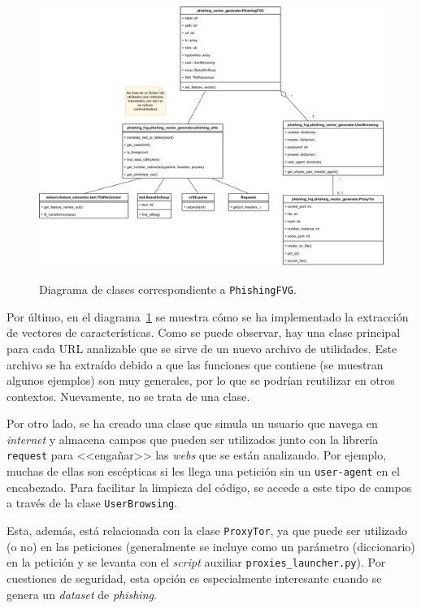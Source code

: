 \begin{figure}[h]
	\caption[Diagrama: clases (\texttt{PhishingFVG})]{Diagrama de clases correspondiente a \texttt{PhishingFVG}.}
	\centering
	\includegraphics[width=\textwidth]{../img/anexos/diagrams/classes-fvg}
	\label{c:classes-fvg}
\end{figure}

Por último, en el diagrama~\ref{c:classes-fvg} se muestra cómo se ha implementado la extracción de vectores de características. Como se puede observar, hay una clase principal para cada URL analizable que se sirve de un nuevo archivo de utilidades. Este archivo se ha extraído debido a que las funciones que contiene (se muestran algunos ejemplos) son muy generales, por lo que se podrían reutilizar en otros contextos. Nuevamente, no se trata de una clase.

Por otro lado, se ha creado una clase que simula un usuario que navega en \textit{internet} y almacena campos que pueden ser utilizados junto con la librería \texttt{request} para <<engañar>> las \textit{webs} que se están analizando. Por ejemplo, muchas de ellas son escépticas si les llega una petición sin un \texttt{user-agent} en el encabezado. Para facilitar la limpieza del código, se accede a este tipo de campos a través de la clase \texttt{UserBrowsing}.

Esta, además, está relacionada con la clase \texttt{ProxyTor}, ya que puede ser utilizado (o no) en las peticiones (generalmente se incluye como un parámetro (diccionario) en la petición y se levanta con el \textit{script} auxiliar \texttt{proxies\_launcher.py}). Por cuestiones de seguridad, esta opción es especialmente interesante cuando se genera un \textit{dataset} de \textit{phishing}.

